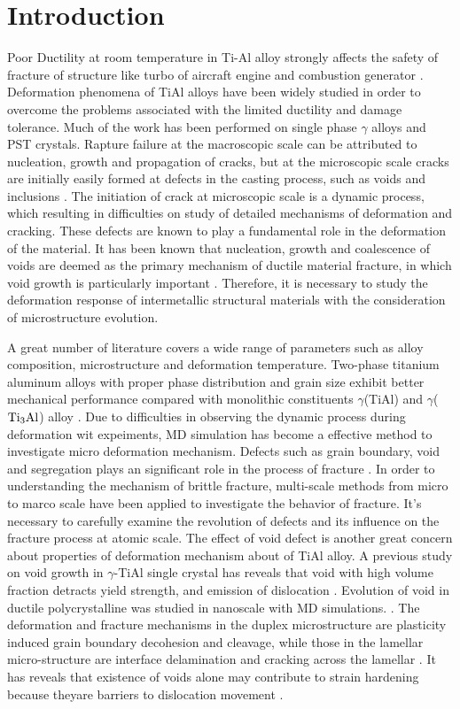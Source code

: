 \documentclass[metals,article,submit,moreauthors,pdftex,10pt,a4paper]{Definitions/mdpi}
\begin{document}
\section{Introduction}
Poor Ductility at room temperature in Ti-Al alloy strongly affects the safety of fracture of structure like turbo of aircraft engine and combustion generator \cite{Munz2017}. Deformation phenomena of TiAl alloys have been widely studied in order to overcome the problems associated with the limited ductility and damage tolerance.  Much of the work has been performed on single phase $\gamma$ alloys and PST crystals\cite{Appel2016}. Rapture failure at the macroscopic scale can be attributed to nucleation, growth and propagation of cracks, but at the microscopic scale cracks are initially easily formed at defects in the casting process, such as voids and inclusions \cite{Tang2014}. The initiation of crack at microscopic scale is a dynamic process, which resulting in difficulties on study of detailed mechanisms of deformation and cracking. These defects are known to play a fundamental role in the deformation of the material. It has been known that nucleation, growth and coalescence of voids are deemed as the primary mechanism of ductile material fracture, in which void growth is particularly important \cite{Hempel2017a}. Therefore, it is necessary to study the deformation response of intermetallic structural materials with the consideration of microstructure evolution.

A great number of literature covers a wide range of parameters such as alloy composition, microstructure and deformation temperature. Two-phase titanium aluminum alloys with proper phase distribution and grain size exhibit better mechanical performance compared with monolithic constituents $\gamma$(TiAl) and $\gamma$($\rm Ti_3Al$) alloy \cite{Kim1995}. Due to difficulties in observing the dynamic process during deformation wit expeiments, MD simulation has become a effective method to investigate micro deformation mechanism. Defects such as grain boundary, void and segregation plays an significant role in the process of fracture \cite{Larsen2016}. In order to understanding the mechanism of brittle fracture, multi-scale methods from micro to marco scale have been applied to investigate the behavior of fracture. It's necessary to carefully examine the revolution of defects and its influence on the fracture process at atomic scale. The effect of void defect is another great concern about properties of deformation mechanism about of TiAl alloy. A previous study on void growth in $\gamma$-TiAl single crystal has reveals that void with high volume fraction detracts yield strength, and emission of dislocation \cite{Tang2014,Xu2015}. Evolution of void in ductile polycrystalline was studied in nanoscale with MD simulations. \cite{Jing2018a,Elkhateeb2018}. The deformation and fracture mechanisms in the duplex microstructure are plasticity induced grain boundary decohesion and cleavage, while those in the lamellar micro-structure are interface delamination and cracking across the lamellar \cite{Tang2014}. It has reveals that existence of voids alone may contribute to strain hardening because theyare barriers to dislocation movement \cite{Xiong2015}. 
\end{document}
